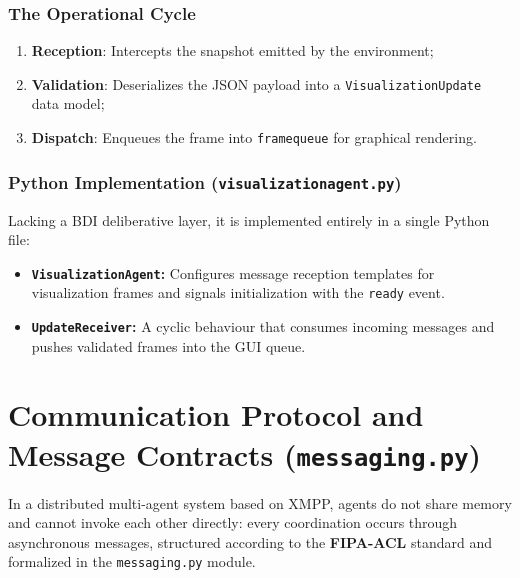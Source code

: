 \documentclass{article}
\renewcommand{\_}{\oldtextunderscore\allowbreak}
\begin{document}
\subsubsection{The Operational Cycle}
\begin{enumerate}
    \item \textbf{Reception}: Intercepts the snapshot emitted by the environment;
    \item \textbf{Validation}: Deserializes the JSON payload into a \texttt{VisualizationUpdate} data model;
    \item \textbf{Dispatch}: Enqueues the frame into \texttt{frame\_queue} for graphical rendering.
\end{enumerate}
\subsubsection{Python Implementation (\texttt{visualization\_agent.py})}
Lacking a BDI deliberative layer, it is implemented entirely in a single Python file:
\begin{itemize}
    \item \textbf{\texttt{VisualizationAgent}:} Configures message reception templates for visualization frames and signals initialization with the \texttt{ready} event.
    \item \textbf{\texttt{UpdateReceiver}:} A cyclic behaviour that consumes incoming messages and pushes validated frames into the GUI queue.
\end{itemize}


\section{Communication Protocol and Message Contracts (\texttt{messaging.py})}
In a distributed multi-agent system based on XMPP, agents do not share memory and cannot invoke each other directly: every coordination occurs through asynchronous messages, structured according to the \textbf{FIPA-ACL} standard and formalized in the \texttt{messaging.py} module.
\end{document}
